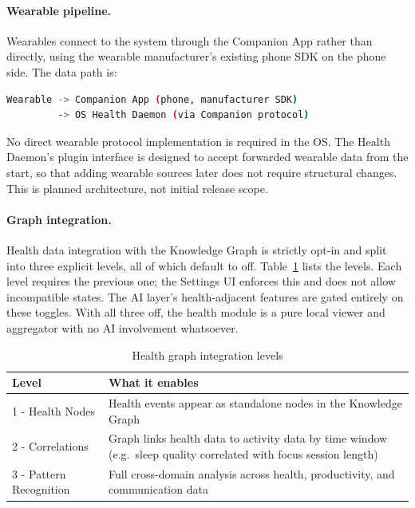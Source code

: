 \paragraph{Wearable pipeline.}
Wearables connect to the system through the Companion App rather than directly,
using the wearable manufacturer's existing phone SDK on the phone side. The
data path is:

\begin{lstlisting}[language=bash, caption={Wearable data path}]
Wearable -> Companion App (phone, manufacturer SDK)
         -> OS Health Daemon (via Companion protocol)
\end{lstlisting}

No direct wearable protocol implementation is required in the OS. The Health
Daemon's plugin interface is designed to accept forwarded wearable data from
the start, so that adding wearable sources later does not require structural
changes. This is planned architecture, not initial release scope.

\paragraph{Graph integration.}
Health data integration with the Knowledge Graph is strictly opt-in and split
into three explicit levels, all of which default to off.
Table~\ref{tab:health-graph} lists the levels. Each level requires the
previous one; the Settings UI enforces this and does not allow incompatible
states. The AI layer's health-adjacent features are gated entirely on these
toggles. With all three off, the health module is a pure local viewer and
aggregator with no AI involvement whatsoever.

\begin{table}[htbp]
\caption{Health graph integration levels}
\label{tab:health-graph}
\begin{tabularx}{\linewidth}{lX}
\toprule
\textbf{Level} & \textbf{What it enables} \\
\midrule
1 - Health Nodes     &
  Health events appear as standalone nodes in the Knowledge Graph \\
2 - Correlations     &
  Graph links health data to activity data by time window
  (e.g.\ sleep quality correlated with focus session length) \\
3 - Pattern Recognition &
  Full cross-domain analysis across health, productivity, and
  communication data \\
\bottomrule
\end{tabularx}
\end{table}


